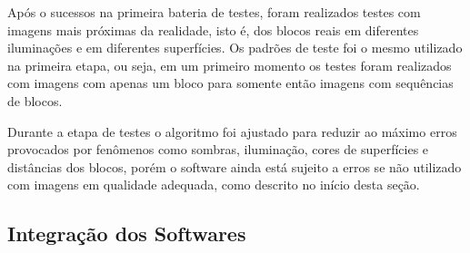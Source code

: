    Após o sucessos na primeira bateria de testes, foram realizados testes com imagens mais próximas da realidade, isto é, dos blocos reais em diferentes iluminações e em diferentes superfícies. Os padrões de teste foi o mesmo utilizado na primeira etapa, ou seja, em um primeiro momento os testes foram realizados com imagens com apenas um bloco para somente então imagens com sequências de blocos.
    
    Durante a etapa de testes o algoritmo foi ajustado para reduzir ao máximo erros provocados por fenômenos como sombras, iluminação, cores de superfícies e distâncias dos blocos, porém o software ainda está sujeito a erros se não utilizado com imagens em qualidade adequada, como descrito no início desta seção.    

    \subsection{Integração dos Softwares}
    
    
    
    